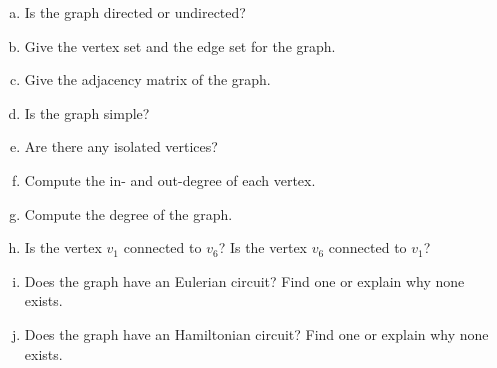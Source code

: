 \documentclass[11pt,letterpaper]{article}
\begin{document}
\begin{enumerate}[(a)]
\item Is the graph directed or undirected?
\item Give the vertex set and the edge set for the graph.
\item Give the adjacency matrix of the graph.
\item Is the graph simple?
\item Are there any isolated vertices?
\item Compute the in- and out-degree of each vertex. 
\item Compute the degree of the graph.
\item Is the vertex $v_1$ connected to $v_6$? Is the vertex $v_6$ connected to $v_1$?
\item Does the graph have an Eulerian circuit? Find one or explain why none exists.  
\item Does the graph have an Hamiltonian circuit? Find one or explain why none exists.  
\end{enumerate} \pspace
\end{document}
